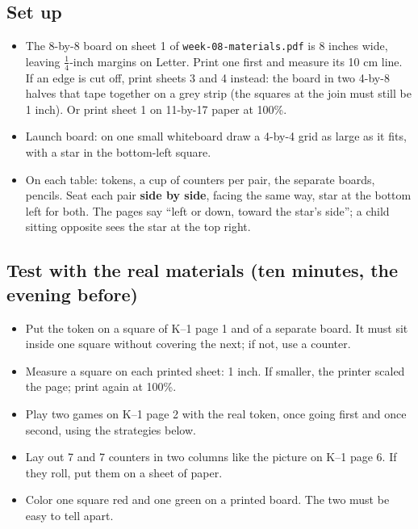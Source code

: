 \documentclass[10pt]{article}
\begin{document}
\subsection{Set up}
\begin{itemize}
\item The 8-by-8 board on sheet 1 of \texttt{week-08-materials.pdf} is 8 inches wide, leaving \(\tfrac14\)-inch margins on Letter. Print one first and measure its 10 cm line. If an edge is cut off, print sheets 3 and 4 instead: the board in two 4-by-8 halves that tape together on a grey strip (the squares at the join must still be 1 inch). Or print sheet 1 on 11-by-17 paper at 100\%.
\item Launch board: on one small whiteboard draw a 4-by-4 grid as large as it fits, with a star in the bottom-left square.
\item On each table: tokens, a cup of counters per pair, the separate boards, pencils. Seat each pair \textbf{side by side}, facing the same way, star at the bottom left for both. The pages say ``left or down, toward the star's side''; a child sitting opposite sees the star at the top right.
\end{itemize}

\subsection{Test with the real materials (ten minutes, the evening before)}
\begin{itemize}
\item Put the token on a square of K--1 page 1 and of a separate board. It must sit inside one square without covering the next; if not, use a counter.
\item Measure a square on each printed sheet: 1 inch. If smaller, the printer scaled the page; print again at 100\%.
\item Play two games on K--1 page 2 with the real token, once going first and once second, using the strategies below.
\item Lay out 7 and 7 counters in two columns like the picture on K--1 page 6. If they roll, put them on a sheet of paper.
\item Color one square red and one green on a printed board. The two must be easy to tell apart.
\end{itemize}
\end{document}

